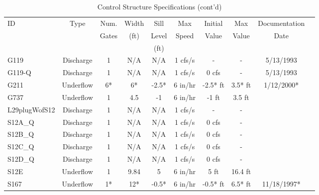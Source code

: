 \scriptsize
\begin{table}[h]
\caption{Control Structure Specifications (cont'd)}
\label{tab:struc-specs2}
\begin{tabular}{@{}lccccccccc@{}}
\toprule
{ID}            & {Type}        & Num.     & Width       & Sill         & Max            & Initial         & Max     & Documentation   \\
                &               & Gates    & (ft)        & Level        & Speed          & Value           & Value   & Date            \\
                &               &          &             & (ft)         &                &                 &         &                 \\
\hline
{G119}          & Discharge     & 1        & N/A         & N/A          & 1 cfs/s        & -               & -       & 5/13/1993       \\
{G119-Q}        & Discharge     & 1        & N/A         & N/A          & 1 cfs/s        & 0 cfs           & -       & 5/13/1993       \\
{G211}          & Underflow     & 6*       & 6*          & -2.5*        & 6 in/hr        & -2.5* ft        & 3.5* ft & 1/12/2000*      \\
{G737}          & Underflow     & 1        & 4.5         & -1           & 6 in/hr        & -1 ft           & 3.5 ft  &                 \\
{L29plugWofS12} & Discharge     & 1        & N/A         & N/A          & 1 cfs/s        & -               & -       &                 \\
{S12A\_Q}       & Discharge     & 1        & N/A         & N/A          & 1 cfs/s        & 0 cfs           & -       &                 \\
{S12B\_Q}       & Discharge     & 1        & N/A         & N/A          & 1 cfs/s        & 0 cfs           & -       &                 \\
{S12C\_Q}       & Discharge     & 1        & N/A         & N/A          & 1 cfs/s        & 0 cfs           & -       &                 \\
{S12D\_Q}       & Discharge     & 1        & N/A         & N/A          & 1 cfs/s        & 0 cfs           & -       &                 \\
{S12E}          & Underflow     & 1        & 9.84        & 5            & 6 in/hr        & 5 ft            & 16.4 ft &                 \\
{S167}          & Underflow     & 1*       & 12*         & -0.5*        & 6 in/hr        & -0.5* ft        & 6.5* ft & 11/18/1997*     \\

\end{tabular}
\end{table}
